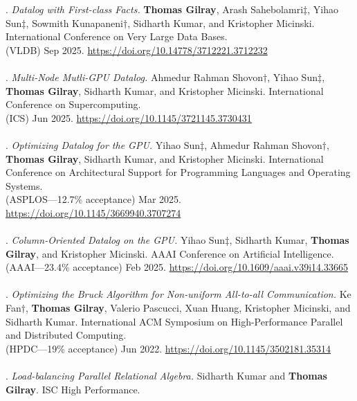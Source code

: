 \paper. \textit{Datalog with First-class Facts.}
\textbf{Thomas Gilray}, Arash Sahebolamri$\ddagger$, Yihao Sun$\ddagger$, Sowmith Kunapaneni$\dagger$, Sidharth Kumar, and Kristopher Micinski.
International Conference on Very Large Data Bases.
\\(VLDB) Sep 2025. \url{https://doi.org/10.14778/3712221.3712232}
\\ \vspace{-0.1cm}\\
\paper. \textit{Multi-Node Mutli-GPU Datalog.}
Ahmedur Rahman Shovon$\dagger$, Yihao Sun$\ddagger$, \textbf{Thomas Gilray}, Sidharth Kumar, and Kristopher Micinski.
International Conference on Supercomputing.
\\(ICS) Jun 2025. \url{https://doi.org/10.1145/3721145.3730431}
\\ \vspace{-0.1cm}\\
\paper. \textit{Optimizing Datalog for the GPU.}
Yihao Sun$\ddagger$, Ahmedur Rahman Shovon$\dagger$, \textbf{Thomas Gilray}, Sidharth Kumar, and Kristopher Micinski.
International Conference on Architectural Support for Programming Languages and Operating Systems.
\\(ASPLOS---12.7\% acceptance) Mar 2025. \url{https://doi.org/10.1145/3669940.3707274}
\\ \vspace{-0.1cm}\\
\paper. \textit{Column-Oriented Datalog on the GPU.}
Yihao Sun$\ddagger$, Sidharth Kumar, \textbf{Thomas Gilray}, and Kristopher Micinski.
AAAI Conference on Artificial Intelligence.
\\(AAAI---23.4\% acceptance) Feb 2025. \url{https://doi.org/10.1609/aaai.v39i14.33665}
\\ \vspace{-0.1cm}\\
\paper. \textit{Optimizing the Bruck Algorithm for Non-uniform All-to-all Communication.}
Ke Fan$\dagger$, \textbf{Thomas Gilray}, Valerio Pascucci, Xuan Huang, Kristopher Micinski, and Sidharth Kumar.
International ACM Symposium on High-Performance Parallel and Distributed Computing.
\\(HPDC---19\% acceptance) Jun 2022. \url{https://doi.org/10.1145/3502181.35314}
\\ \vspace{-0.1cm}\\
\paper. \textit{Load-balancing Parallel Relational Algebra.}
Sidharth Kumar and \textbf{Thomas Gilray}.
ISC High Performance.
